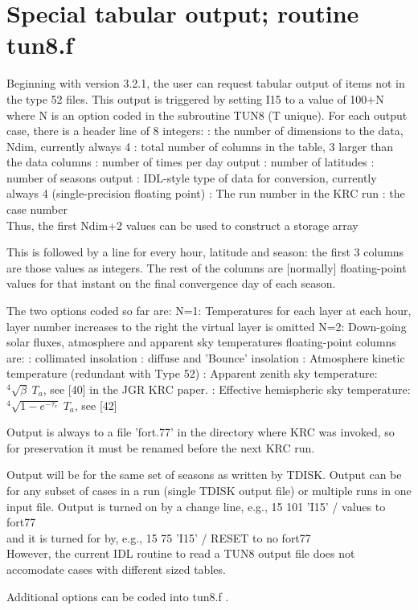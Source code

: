 
\section{Special tabular output; routine tun8.f}
Beginning with version 3.2.1, the user can request tabular output of items not
in the type 52 files. This output is triggered by setting I15 to a value of
100+N where N is an option coded in the subroutine TUN8 (T unique). For each
output case, there is a header line of 8 integers:
: the number of dimensions to the data, Ndim, currently always 4
: total number of columns in the table, 3 larger than the data columns
: number of times per day output
: number of latitudes
: number of seasons output
: IDL-style type of data for conversion, currently always 4 (single-precision floating point)
: The run number in the KRC run
: the case number
\\ Thus, the first Ndim+2 values can be used to construct a storage array

This is followed by a line for every hour, latitude and season: the first 3
columns are those values as integers. The rest of the columns are [normally]
floating-point values for that instant on the final convergence day of each
season.

The two options coded so far are:
\qi N=1: Temperatures for each layer at each hour, layer number increases to the right
\qii the virtual layer is omitted
\qi N=2: Down-going solar fluxes, atmosphere and apparent sky temperatures
\qii floating-point columns are: 
: collimated insolation
: diffuse and 'Bounce' insolation 
: Atmosphere kinetic temperature (redundant with Type 52)
: Apparent zenith sky temperature: $^4 \sqrt{ \beta} \ T_a$, see [40] in the JGR KRC paper.
: Effective hemispheric sky temperature:  $^4 \sqrt{1-e^{-\tau_r}} \ T_a$, see [42] 

Output is always to a file 'fort.77' in the directory where KRC was invoked, so for preservation it must be renamed before the next KRC run. 

Output will be for the same set of seasons as written by TDISK. Output can be
for any subset of cases in a run (single TDISK output file) or multiple runs in
one input file.  Output is turned on by a change line, e.g., 
 15 101 'I15' / values to fort77
\\ and it is turned for by, e.g., 
 15 75 'I15' / RESET to no fort77
\\  However, the current IDL routine to read a TUN8 output file does
not accomodate cases with different sized tables.

Additional options can be coded into tun8.f .
